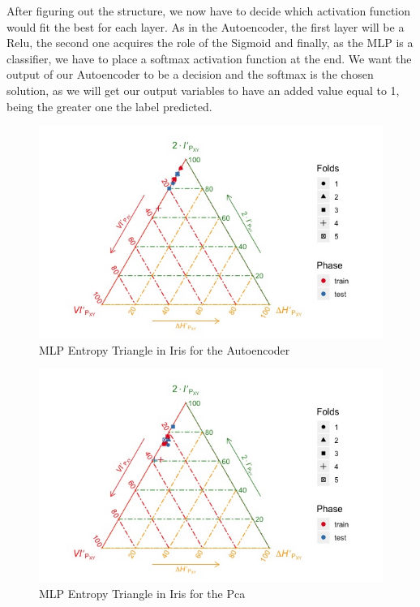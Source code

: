 After figuring out the structure, we now have to decide which activation function would fit the best for each layer. As in the Autoencoder, the first layer will be a Relu, the second one acquires the role of the Sigmoid and finally, as the MLP is a classifier, we have to place a softmax activation function at the end. We want the output of our Autoencoder to be a decision and the softmax is the chosen solution, as we will get our output variables to have an added value equal to 1, being the greater one the label predicted. \par

\begin{figure}[H]
	
	\includegraphics[width=1\linewidth]{Figuras_tfg/ET_Iris_Auto_Mlp}
	\caption{MLP Entropy Triangle in Iris for the Autoencoder}
	\label{fig:figure_ET_MLP_Iris_Autoencoder}
\end{figure}

\begin{figure}[H]
	
	\includegraphics[width=1\linewidth]{Figuras_tfg/ET_Iris_Pca_Mlp}
	\caption{MLP Entropy Triangle in Iris for the Pca}
	\label{fig:figure_ET_MLP_Iris_Pca}
\end{figure}

